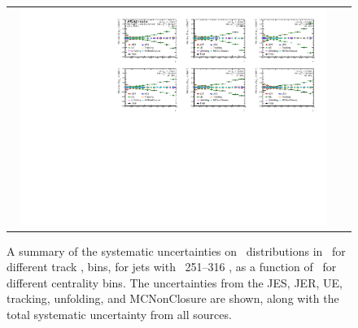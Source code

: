 \begin{figure}
{\begin{tabular}{cc}
	 \includegraphics[page=26, width=0.95\textwidth]{figures_systematics/Summary_ChPS_dR_sys_PbPb_error} \\
\end{tabular} }
   \caption{A summary of the systematic uncertainties on \Dptr\ distributions in \pbpb\ for different track \pt, bins, for jets with \pt\ 251--316  \GeV, as a function of \rvar\ for different centrality bins. The uncertainties from the JES, JER, UE, tracking, unfolding, and MCNonClosure are shown, along with the total systematic uncertainty from all sources. }
      \label{fig:dptr_sys_uncert_A3}
\end{figure}


 
